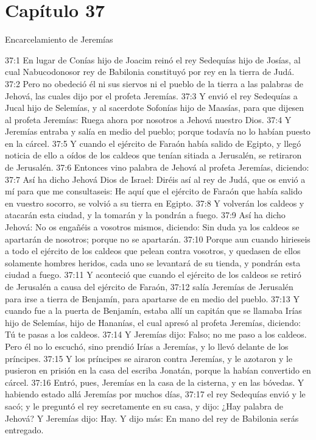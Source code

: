 \section*{Capítulo 37 }
Encarcelamiento de Jeremías 
 
37:1 En lugar de Conías hijo de Joacim reinó el rey Sedequías hijo de Josías, al cual Nabucodonosor rey de Babilonia constituyó por rey en la tierra de Judá. 
37:2 Pero no obedeció él ni sus siervos ni el pueblo de la tierra a las palabras de Jehová, las cuales dijo por el profeta Jeremías. 
37:3 Y envió el rey Sedequías a Jucal hijo de Selemías, y al sacerdote Sofonías hijo de Maasías, para que dijesen al profeta Jeremías: Ruega ahora por nosotros a Jehová nuestro Dios. 
37:4 Y Jeremías entraba y salía en medio del pueblo; porque todavía no lo habían puesto en la cárcel. 
37:5 Y cuando el ejército de Faraón había salido de Egipto, y llegó noticia de ello a oídos de los caldeos que tenían sitiada a Jerusalén, se retiraron de Jerusalén. 
37:6 Entonces vino palabra de Jehová al profeta Jeremías, diciendo: 
37:7 Así ha dicho Jehová Dios de Israel: Diréis así al rey de Judá, que os envió a mí para que me consultaseis: He aquí que el ejército de Faraón que había salido en vuestro socorro, se volvió a su tierra en Egipto. 
37:8 Y volverán los caldeos y atacarán esta ciudad, y la tomarán y la pondrán a fuego. 
37:9 Así ha dicho Jehová: No os engañéis a vosotros mismos, diciendo: Sin duda ya los caldeos se apartarán de nosotros; porque no se apartarán. 
37:10 Porque aun cuando hirieseis a todo el ejército de los caldeos que pelean contra vosotros, y quedasen de ellos solamente hombres heridos, cada uno se levantará de su tienda, y pondrán esta ciudad a fuego. 
37:11 Y aconteció que cuando el ejército de los caldeos se retiró de Jerusalén a causa del ejército de Faraón, 
37:12 salía Jeremías de Jerusalén para irse a tierra de Benjamín, para apartarse de en medio del pueblo. 
37:13 Y cuando fue a la puerta de Benjamín, estaba allí un capitán que se llamaba Irías hijo de Selemías, hijo de Hananías, el cual apresó al profeta Jeremías, diciendo: Tú te pasas a los caldeos. 
37:14 Y Jeremías dijo: Falso; no me paso a los caldeos. Pero él no lo escuchó, sino prendió Irías a Jeremías, y lo llevó delante de los príncipes. 
37:15 Y los príncipes se airaron contra Jeremías, y le azotaron y le pusieron en prisión en la casa del escriba Jonatán, porque la habían convertido en cárcel. 
37:16 Entró, pues, Jeremías en la casa de la cisterna, y en las bóvedas. Y habiendo estado allá Jeremías por muchos días, 
37:17 el rey Sedequías envió y le sacó; y le preguntó el rey secretamente en su casa, y dijo: ¿Hay palabra de Jehová? Y Jeremías dijo: Hay. Y dijo más: En mano del rey de Babilonia serás entregado. 
